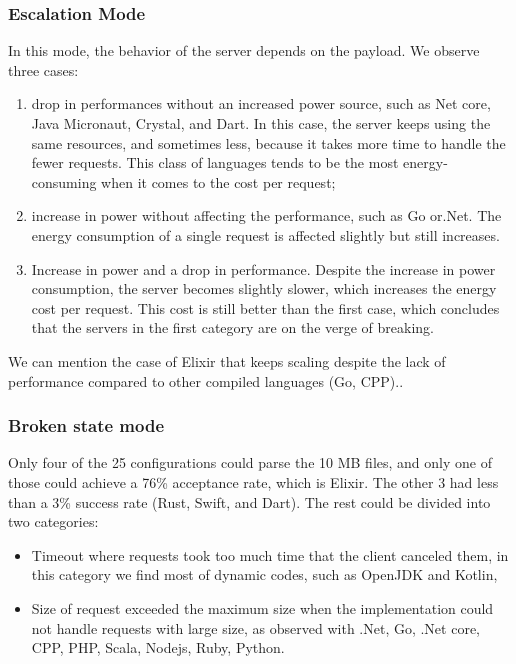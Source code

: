 \subsubsection{Escalation Mode}
In this mode, the behavior of the server depends on the payload. We observe three cases:
\begin{enumerate}
    \item drop in performances without an increased power source, such as Net core, Java Micronaut, Crystal, and Dart.
    In this case, the server keeps using the same resources, and sometimes less, because it takes more time to handle the fewer requests.
    This class of languages tends to be the most energy-consuming when it comes to the cost per request;
    \item increase in power without affecting the performance, such as Go or.Net.
    The energy consumption of a single request is affected slightly but still increases.
    \item Increase in power and a drop in performance.
    Despite the increase in power consumption, the server becomes slightly slower, which increases the energy cost per request.
    This cost is still better than the first case, which concludes that the servers in the first category are on the verge of breaking.
\end{enumerate}

We can mention the case of Elixir that keeps scaling despite the lack of performance compared to other compiled languages (Go, CPP)..

\subsubsection{Broken state mode }
Only four of the 25 configurations could parse the 10 MB files, and only one of those could achieve a 76\% acceptance rate, which is Elixir. The other 3 had less than a 3\% success rate (Rust, Swift, and Dart).
The rest could be divided into two categories:
\begin{itemize}
    \item \textsf{Timeout} where requests took too much time that the client canceled them, in this category we find most of dynamic codes, such as OpenJDK and Kotlin,
    \item \textsf{Size of request} exceeded the maximum size when the implementation could not handle requests with large size, as observed with .Net, Go, .Net core, CPP, PHP, Scala, Nodejs, Ruby, Python.
\end{itemize}


